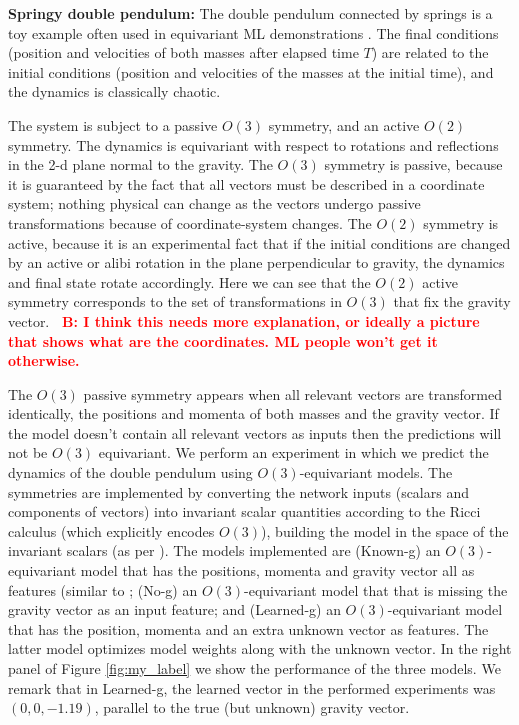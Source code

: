 \documentclass{article}
\theoremstyle{plain}
\theoremstyle{definition}
\theoremstyle{remark}
\newcommand{\bernhard}[1]{ \textcolor{red}{\textbf{~B: #1}}}
\begin{document}
\textbf{Springy double pendulum:}
The double pendulum connected by springs is a toy example often used in equivariant ML demonstrations \cite{finzi2021practical,yao2021simple, villar2022dimensionless}. 
The final conditions (position and velocities of both masses after elapsed time $T$) are related to the initial conditions (position and velocities of the masses at the initial time), and the dynamics is classically chaotic.

The system is subject to a passive $O(3)$ symmetry, and an active $O(2)$ symmetry. The dynamics is equivariant with respect to rotations and reflections in the 2-d plane normal to the gravity. 
The $O(3)$ symmetry is passive, because it is guaranteed by the fact that all vectors must be described in a coordinate system; nothing physical can change as the vectors undergo passive transformations because of coordinate-system changes.
The $O(2)$ symmetry is active, because it is an experimental fact that if the initial conditions are changed by an active or alibi rotation in the plane perpendicular to gravity, the dynamics and final state rotate accordingly.
Here we can see that the $O(2)$ active symmetry corresponds to the set of transformations in $O(3)$ that fix the gravity vector. 
\bernhard{I think this needs more explanation, or ideally a picture that shows what are the coordinates. ML people won't get it otherwise.}

The $O(3)$ passive symmetry appears when all relevant vectors are transformed identically, the positions and momenta of both masses and the gravity vector. If the model doesn't contain all relevant vectors as inputs then the predictions will not be $O(3)$ equivariant. We perform an experiment in which we predict the dynamics of the double pendulum using $O(3)$-equivariant models. The symmetries are implemented by converting the network inputs (scalars and components of vectors) into invariant scalar quantities according to the Ricci calculus (which explicitly encodes $O(3)$), building the model in the space of the invariant scalars (as per \citealt{villar2021scalars}). The models implemented are (Known-g) an $O(3)$-equivariant model that has the positions, momenta and gravity vector all as features (similar to \citealt{villar2021scalars, yao2021simple}; (No-g) an $O(3)$-equivariant model that that is missing the gravity vector as an input feature; and (Learned-g) an $O(3)$-equivariant model that has the position, momenta and an extra unknown vector as features. The latter model optimizes model weights along with the unknown vector. 
In the right panel of Figure \ref{fig:my_label} we show the performance of the three models. We remark that in Learned-g, the learned vector in the performed experiments was $(0, 0, -1.19)$, parallel to the true (but unknown) gravity vector.
\end{document}
